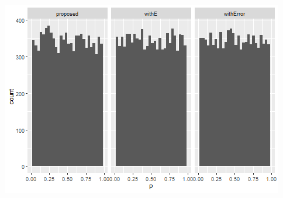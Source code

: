 \documentclass[
]{article}
\begin{document}
\includegraphics{simulation_bootstrapping_files/figure-latex/unnamed-chunk-4-1.png}
\end{document}
